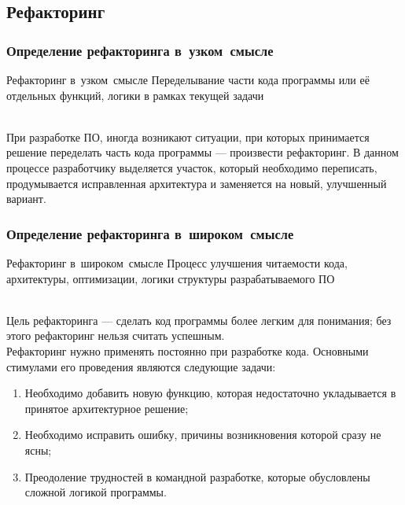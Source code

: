 \documentclass[lecturenotes]{../industrial-development}
\begin{document}
\subsection{Рефакторинг}
\begin{frame} \frametitle{Определение рефакторинга в~узком~смысле}
	\begin{block}{Рефакторинг в~узком~смысле}
		Переделывание части кода программы или её отдельных функций, логики в рамках текущей задачи
	\end{block}
\end{frame}
\lecturenotes
\\При разработке ПО, иногда возникают ситуации, при которых принимается решение переделать часть кода программы --- произвести рефакторинг. В данном процессе разработчику выделяется участок, который необходимо переписать, продумывается исправленная архитектура и заменяется на новый, улучшенный вариант.

\begin{frame} \frametitle{Определение рефакторинга в~широком~смысле}
	\begin{block}{Рефакторинг в~широком~смысле}
		Процесс улучшения читаемости кода, архитектуры, оптимизации, логики структуры разрабатываемого ПО
	\end{block}
\end{frame}
\lecturenotes
\\Цель рефакторинга — сделать код программы более легким для понимания; без этого рефакторинг нельзя считать успешным.\\
Рефакторинг нужно применять постоянно при разработке кода. Основными стимулами его проведения являются следующие задачи:\\
\begin{enumerate}
	\item Необходимо добавить новую функцию, которая недостаточно укладывается в принятое архитектурное решение;
	\item Необходимо исправить ошибку, причины возникновения которой сразу не ясны;
	\item Преодоление трудностей в командной разработке, которые обусловлены сложной логикой программы.
\end{enumerate}
\end{document}
